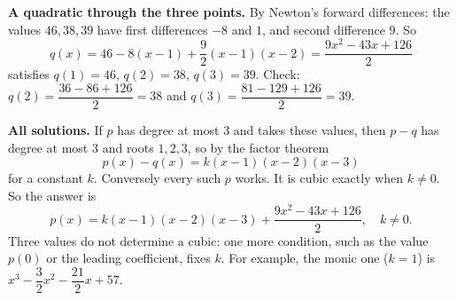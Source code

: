 \textbf{A quadratic through the three points.} By Newton's forward differences: the values $46,38,39$ have first differences $-8$ and $1$, and second difference $9$. So
\[q(x)=46-8(x-1)+\dfrac92(x-1)(x-2)=\dfrac{9x^2-43x+126}{2}\]
satisfies $q(1)=46$, $q(2)=38$, $q(3)=39$. Check: $q(2)=\dfrac{36-86+126}{2}=38$ and $q(3)=\dfrac{81-129+126}{2}=39$.

\textbf{All solutions.} If $p$ has degree at most $3$ and takes these values, then $p-q$ has degree at most $3$ and roots $1,2,3$, so by the factor theorem
\[p(x)-q(x)=k(x-1)(x-2)(x-3)\]
for a constant $k$. Conversely every such $p$ works. It is cubic exactly when $k\ne0$. So the answer is
\[\boxed{p(x)=k(x-1)(x-2)(x-3)+\dfrac{9x^2-43x+126}{2},\quad k\ne0.}\]
Three values do not determine a cubic: one more condition, such as the value $p(0)$ or the leading coefficient, fixes $k$. For example, the monic one ($k=1$) is $x^3-\dfrac32x^2-\dfrac{21}{2}x+57$.
